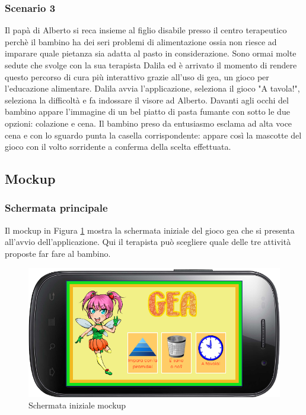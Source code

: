 \subsubsection{Scenario 3}
Il papà di Alberto si reca insieme al figlio disabile presso il centro terapeutico perchè il bambino ha dei seri problemi di alimentazione ossia non riesce ad imparare quale pietanza sia adatta al pasto in considerazione. Sono ormai molte sedute che svolge con la sua terapista Dalila ed è arrivato il momento di rendere questo percorso di cura più interattivo grazie all'uso di \acs{gea}, un gioco per l'educazione alimentare. Dalila avvia l'applicazione, seleziona il gioco "A tavola!", seleziona la difficoltà e fa indossare il visore ad Alberto. Davanti agli occhi del bambino appare l'immagine di un bel piatto di pasta fumante con sotto le due opzioni: colazione e cena. Il bambino preso da entusiasmo esclama ad alta voce cena e con lo sguardo punta la casella corrispondente: appare così la mascotte del gioco con il volto sorridente a conferma della scelta effettuata.
\clearpage

\subsection{Mockup}
\subsubsection{Schermata principale}
Il mockup in Figura \ref{fig:Schermata iniziale} mostra la schermata iniziale del gioco \acs{gea} che si presenta all'avvio dell'applicazione. Qui il terapista può scegliere quale delle tre attività proposte far fare al bambino.

\vspace{70pt}

\begin{figure}[htbp]
\centering
\includegraphics[width=\textwidth]{Images/Mockup/schermatainiziale}
\caption{Schermata iniziale mockup}
\label{fig:Schermata iniziale}
\end{figure}
\clearpage
